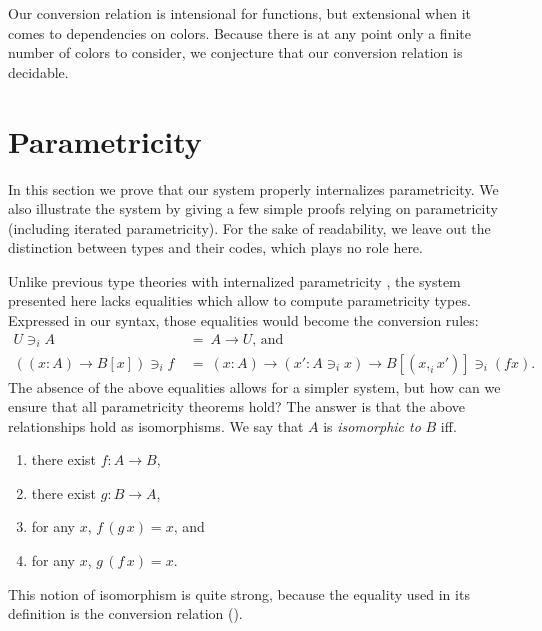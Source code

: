 \documentclass[english]{PaperTools/latex/entcs}
\theoremstyle{plain}
\theoremstyle{definition}
\theoremstyle{remark}
\newcommand\CP[3]{(#2,_{#1} #3)}
\newcommand\op[1]{∋_{#1}}
\begin{document}
Our conversion relation is intensional for functions, but extensional
when it comes to dependencies on colors. Because there is at any point
only a finite number of colors to consider, we conjecture that our
conversion relation is decidable.

\section{Parametricity}
\label{sec:parametricity}
In this section we prove that our system properly internalizes
parametricity. We also illustrate the system by giving a few simple
proofs relying on parametricity (including iterated parametricity).
For the sake of readability, we leave out the distinction between types
and their codes, which plays no role here.

Unlike previous type theories with internalized parametricity
\citep{bernardy_computational_2012, bernardy_type-theory_2013}, the
system presented here lacks equalities which allow to compute
parametricity types. Expressed in our syntax, those equalities would
become the conversion rules:
\begin{align*}
  U \op i A              &~=~ A → U\text{, and} \\
  ((x:A) → B[x]) \op i f &~=~ (x:A) → (x' : A \op i x) → B[\CP i x {x'}] \op i (f x)\text{.}
\end{align*}
%
The absence of the above equalities allows for a simpler system, but
how can we ensure that all parametricity theorems hold?  The answer is
that the above relationships hold as isomorphisms.
%
We say that $A$ is \emph{isomorphic to} $B$ iff.
\begin{enumerate}
  \item there exist $f : A → B$,
  \item there exist $g : B → A$,
  \item for any $x$, $f\, (g\, x) = x$, and
  \item for any $x$, $g\, (f\, x) = x$.
\end{enumerate}
This notion of isomorphism is quite strong, because the equality used
in its definition is the conversion relation ().
\end{document}
